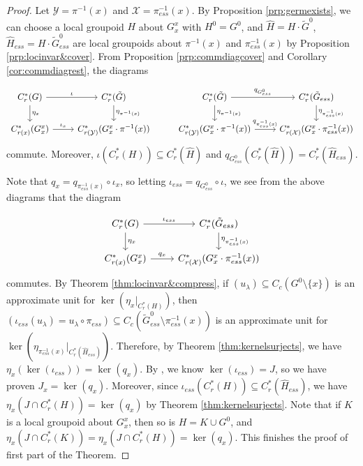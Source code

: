 \documentclass[a4paper, 12pt]{amsart}
\theoremstyle{definition}
\theoremstyle{remark}
\numberwithin{equation}{section}
\begin{document}
\begin{proof}

Let $\mathcal{Y} = \pi^{-1}(x)$ and $\mathcal{X} = \pi^{-1}_{ess}(x)$. By Proposition \ref{prp:germexists},  we can choose a local groupoid $H$ about $G^{x}_{x}$ with $H^{0} = G^{0}$, and $\hat{H} = H\cdot \tilde{G}^{0}$, $\hat{H}_{ess} = H\cdot\tilde{G}_{ess}^{0}$ are local groupoids about $\pi^{-1}(x)$ and $\pi^{-1}_{ess}(x)$ by Proposition \ref{prp:locinvar&cover}. From Proposition \ref{prp:commdiagcover} and Corollary \ref{cor:commdiagrest}, the diagrams

$$
\begin{tikzcd}
C^{*}_{r}(G) \arrow[r, "\iota"] \arrow[d, "\eta_{x}"] & C^{*}_{r}(\tilde{G}) \arrow[d, "\eta_{\pi^{-1}(x)}"] & C^{*}_{r}(\tilde{G}) \arrow[d, "\eta_{\pi^{-1}(x)}"] \arrow[r, "q_{G^{0}_{ess}}"]    & C^{*}_{r}(\tilde{G}_{ess}) \arrow[d, "\eta_{\pi^{-1}_{ess}(x)}"] \\
C^{*}_{r(x)}(G^{x}_{x}) \arrow[r, "\iota_{x}"]        & C^{*}_{r(\mathcal{Y})}(G^{x}_{x}\cdot\pi^{-1}(x))    & C^{*}_{r(\mathcal{Y})}(G^{x}_{x}\cdot\pi^{-1}(x)) \arrow[r, "q_{\pi^{-1}_{ess}(x)}"] & C^{*}_{r(\mathcal{X})}(G^{x}_{x}\cdot\pi_{ess}^{-1}(x))         
\end{tikzcd}
$$ commute. Moreover, $\iota(C^{*}_{r}(H))\subseteq C^{*}_{r}(\hat{H})$ and $q_{G^{0}_{ess}}(C^{*}_{r}(\hat{H})) = C^{*}_{r}(\hat{H}_{ess})$.

Note that $q_{x} = q_{\pi^{-1}_{ess}(x)}\circ \iota_{x}$, so letting $\iota_{ess} = q_{G^{0}_{ess}}\circ \iota$, we see from the above diagrams that the diagram

    $$
\begin{tikzcd}
C^{*}_{r}(G) \arrow[r, "\iota_{ess}"] \arrow[d, "\eta_{x}"] & C^{*}_{r}(\tilde{G}_{ess}) \arrow[d, "\eta_{\pi^{-1}_{ess}(x)}"] \\
C^{*}_{r(x)}(G^{x}_{x}) \arrow[r, "q_{x}"]                        & C^{*}_{r(\mathcal{X})}(G^{x}_{x}\cdot\pi^{-1}_{ess}(x))         
\end{tikzcd}$$ commutes. By Theorem \ref{thm:locinvar&compress}, if $(u_{\lambda})\subseteq C_{c}(G^{0}\setminus \{x\})$ is an approximate unit for $\ker(\eta_{x}|_{C^{*}_{r}(H)})$, then $(\iota_{ess}(u_{\lambda}) = u_{\lambda}\circ \pi_{ess})\subseteq C_{c}(\tilde{G}^{0}_{ess}\setminus \pi^{-1}_{ess}(x))$ is an approximate unit for $\ker(\eta_{\pi^{-1}_{ess}(x)}|_{C^{*}_{r}(\hat{H}_{ess})})$. Therefore, by Theorem \ref{thm:kernelsurjects}, we have $\eta_{x}(\ker(\iota_{ess})) = \ker(q_{x})$. By \cite[Proposition~4.15]{BGHL25}, we know $\ker(\iota_{ess}) = J$, so we have proven $J_{x} = \ker(q_{x})$. Moreover, since $\iota_{ess}(C^{*}_{r}(H))\subseteq C^{*}_{r}(\hat{H}_{ess})$, we have $\eta_{x}(J\cap C^{*}_{r}(H)) = \ker(q_{x})$ by Theorem \ref{thm:kernelsurjects}. Note that if $K$ is a local groupoid about $G^{x}_{x}$, then so is $H = K\cup G^{0}$, and $\eta_{x}(J\cap C^{*}_{r}(K)) = \eta_{x}(J\cap C^{*}_{r}(H)) = \ker(q_{x})$. This finishes the proof of first part of the Theorem.


\end{proof}
\end{document}
